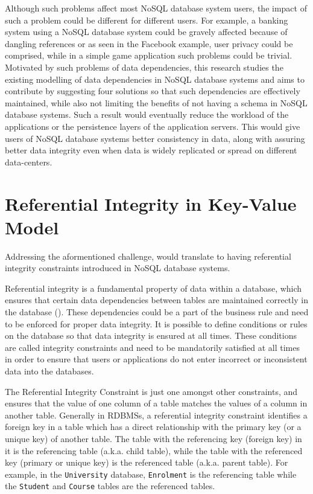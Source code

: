 Although such problems affect most \ac{NoSQL} database system users, the impact of
such a problem could be different for different users. For example, a banking
system using a \ac{NoSQL} database system could be gravely affected because of
dangling references or as seen in the Facebook example, user privacy could be
comprised, while in a simple game application such problems could be trivial.
Motivated by such problems of data dependencies, this research studies the
existing modelling of data dependencies in \ac{NoSQL} database systems and aims to
contribute by suggesting four solutions so that such dependencies are
effectively maintained, while also not limiting the benefits of not having a
schema in \ac{NoSQL} database systems. Such a result would eventually reduce the
workload of the applications or the persistence layers of the application
servers. This would give users of \ac{NoSQL} database systems better consistency in
data, along with assuring better data integrity even when data is widely
replicated or spread on different data-centers.



\section{Referential Integrity in Key-Value
Model}\label{s:referential-integrity}
Addressing the aformentioned challenge, would translate to having referential
integrity constraints introduced in \ac{NoSQL} database systems.

Referential integrity is a fundamental property of data within a database, which
ensures that certain data dependencies between tables are maintained correctly
in the database (). These dependencies could be a part of the
business rule and need to be enforced for proper data integrity. It is possible
to define conditions or rules on the database so that data integrity is ensured
at all times. These conditions are called integrity constraints and need to be
mandatorily satisfied at all times in order to ensure that users or applications
do not enter incorrect or inconsistent data into the databases.

The Referential Integrity Constraint is just one amongst other constraints, and
ensures that the value of one column of a table matches the values of a column
in another table. Generally in \acp{RDBMS}, a referential integrity constraint
identifies a foreign key in a table which has a direct relationship with the
primary key (or a unique key) of another table. The table with the referencing
key (foreign key) in it is the referencing table (a.k.a. child table), while the
table with the referenced key (primary or unique key) is the referenced table
(a.k.a.
parent table). For example, in the \texttt{University} database,
\texttt{Enrolment} is the referencing table while the \texttt{Student} and
\texttt{Course} tables are the referenced tables.


